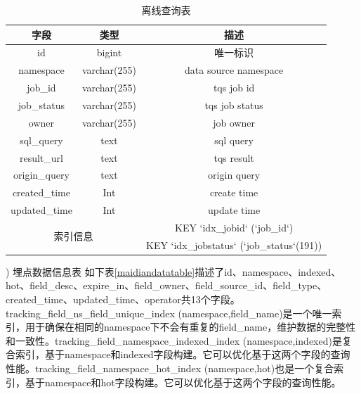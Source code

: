 \begin{table}[h] 
\centering %
\caption{离线查询表}
\begin{tabular}{|c|c|c|}  
\hline  
字段 & 类型 & 描述 \\ \hline  
id & bigint & 唯一标识 \\ \hline  
namespace & varchar(255) & data source namespace \\ \hline  
job\_id & varchar(255) & tqs job id \\ \hline  
job\_status & varchar(255) & tqs job status \\ \hline  
owner & varchar(255) & job owner \\ \hline  
sql\_query & text & sql query \\ \hline  
result\_url & text & tqs result \\ \hline  
origin\_query & text & origin query \\ \hline  
created\_time & Int & create time \\ \hline  
updated\_time & Int & update time \\ \hline  
\multicolumn{2}{|c|}{\multirow{2}{*}{索引信息}} & KEY `idx\_jobid` (`job\_id`) \\   
\cline{3-3}  
\multicolumn{2}{|c|}{} & KEY `idx\_jobstatus` (`job\_status`(191)) \\ \hline  
\end{tabular} 
\label{offlineSearch}  
\end{table}

)	埋点数据信息表
如下表\ref{maidiandatatable}描述了id、namespace、indexed、hot、field\_desc、expire\_in、field\_owner、field\_source\_id、field\_type、created\_time、updated\_time、operator共13个字段。
tracking\_field\_ns\_field\_unique\_index (namespace,field\_name)是一个唯一索引，用于确保在相同的namespace下不会有重复的field\_name，维护数据的完整性和一致性。tracking\_field\_namespace\_indexed\_index (namespace,indexed)是复合索引，基于namespace和indexed字段构建。它可以优化基于这两个字段的查询性能。tracking\_field\_namespace\_hot\_index (namespace,hot)也是一个复合索引，基于namespace和hot字段构建。它可以优化基于这两个字段的查询性能。

